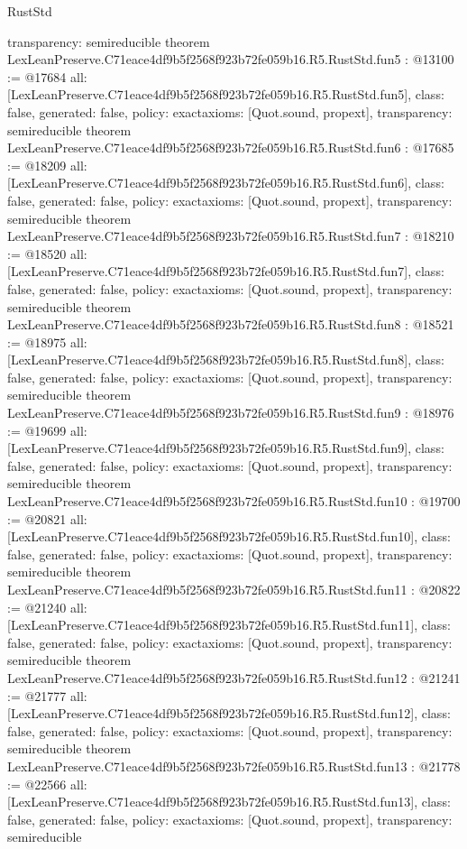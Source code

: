 \begin{lexlean}{RustStd}
\begin{coremodule}
{  transparency: semireducible
}
theorem LexLeanPreserve.C71eace4df9b5f2568f923b72fe059b16.R5.RustStd.fun5 : @13100 := @17684 {
  all: [LexLeanPreserve.C71eace4df9b5f2568f923b72fe059b16.R5.RustStd.fun5],
  class: false,
  generated: false,
  policy: exact{axioms: [Quot.sound, propext]},
  transparency: semireducible
}
theorem LexLeanPreserve.C71eace4df9b5f2568f923b72fe059b16.R5.RustStd.fun6 : @17685 := @18209 {
  all: [LexLeanPreserve.C71eace4df9b5f2568f923b72fe059b16.R5.RustStd.fun6],
  class: false,
  generated: false,
  policy: exact{axioms: [Quot.sound, propext]},
  transparency: semireducible
}
theorem LexLeanPreserve.C71eace4df9b5f2568f923b72fe059b16.R5.RustStd.fun7 : @18210 := @18520 {
  all: [LexLeanPreserve.C71eace4df9b5f2568f923b72fe059b16.R5.RustStd.fun7],
  class: false,
  generated: false,
  policy: exact{axioms: [Quot.sound, propext]},
  transparency: semireducible
}
theorem LexLeanPreserve.C71eace4df9b5f2568f923b72fe059b16.R5.RustStd.fun8 : @18521 := @18975 {
  all: [LexLeanPreserve.C71eace4df9b5f2568f923b72fe059b16.R5.RustStd.fun8],
  class: false,
  generated: false,
  policy: exact{axioms: [Quot.sound, propext]},
  transparency: semireducible
}
theorem LexLeanPreserve.C71eace4df9b5f2568f923b72fe059b16.R5.RustStd.fun9 : @18976 := @19699 {
  all: [LexLeanPreserve.C71eace4df9b5f2568f923b72fe059b16.R5.RustStd.fun9],
  class: false,
  generated: false,
  policy: exact{axioms: [Quot.sound, propext]},
  transparency: semireducible
}
theorem LexLeanPreserve.C71eace4df9b5f2568f923b72fe059b16.R5.RustStd.fun10 : @19700 := @20821 {
  all: [LexLeanPreserve.C71eace4df9b5f2568f923b72fe059b16.R5.RustStd.fun10],
  class: false,
  generated: false,
  policy: exact{axioms: [Quot.sound, propext]},
  transparency: semireducible
}
theorem LexLeanPreserve.C71eace4df9b5f2568f923b72fe059b16.R5.RustStd.fun11 : @20822 := @21240 {
  all: [LexLeanPreserve.C71eace4df9b5f2568f923b72fe059b16.R5.RustStd.fun11],
  class: false,
  generated: false,
  policy: exact{axioms: [Quot.sound, propext]},
  transparency: semireducible
}
theorem LexLeanPreserve.C71eace4df9b5f2568f923b72fe059b16.R5.RustStd.fun12 : @21241 := @21777 {
  all: [LexLeanPreserve.C71eace4df9b5f2568f923b72fe059b16.R5.RustStd.fun12],
  class: false,
  generated: false,
  policy: exact{axioms: [Quot.sound, propext]},
  transparency: semireducible
}
theorem LexLeanPreserve.C71eace4df9b5f2568f923b72fe059b16.R5.RustStd.fun13 : @21778 := @22566 {
  all: [LexLeanPreserve.C71eace4df9b5f2568f923b72fe059b16.R5.RustStd.fun13],
  class: false,
  generated: false,
  policy: exact{axioms: [Quot.sound, propext]},
  transparency: semireducible
}
\end{coremodule}
\end{lexlean}
